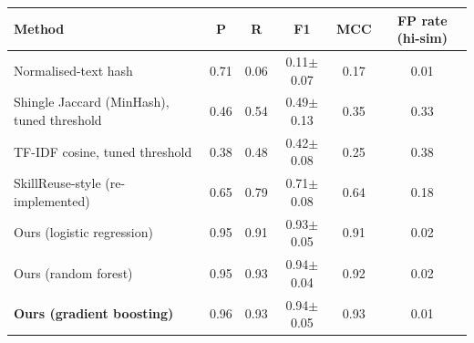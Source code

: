 \begin{tabular}{lccccc}
\toprule
Method & P & R & F1 & MCC & FP rate (hi-sim) \\
\midrule
Normalised-text hash & 0.71 & 0.06 & 0.11$\pm$0.07 & 0.17 & 0.01 \\
Shingle Jaccard (MinHash), tuned threshold & 0.46 & 0.54 & 0.49$\pm$0.13 & 0.35 & 0.33 \\
TF-IDF cosine, tuned threshold & 0.38 & 0.48 & 0.42$\pm$0.08 & 0.25 & 0.38 \\
SkillReuse-style (re-implemented) & 0.65 & 0.79 & 0.71$\pm$0.08 & 0.64 & 0.18 \\
\midrule
Ours (logistic regression) & 0.95 & 0.91 & 0.93$\pm$0.05 & 0.91 & 0.02 \\
Ours (random forest) & 0.95 & 0.93 & 0.94$\pm$0.04 & 0.92 & 0.02 \\
\textbf{Ours (gradient boosting)} & 0.96 & 0.93 & 0.94$\pm$0.05 & 0.93 & 0.01 \\
\bottomrule
\end{tabular}
